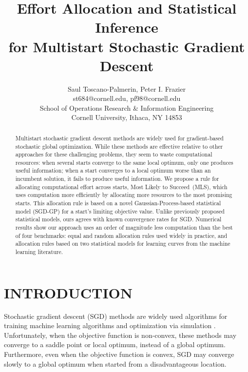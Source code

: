 \documentclass[12pt,english]{article}
\date{}
\newcommand{\abbrv}{MLS}
\newcommand{\name}{Most Likely to Succeed}
\begin{document}
\title{Effort Allocation and Statistical Inference\\ for Multistart Stochastic Gradient Descent}


\author{Saul Toscano-Palmerin, Peter I. Frazier\\
st684@cornell.edu, pf98@cornell.edu\\
School of Operations Research \& Information Engineering\\
Cornell University, Ithaca, NY 14853\\
}


\maketitle



\begin{abstract} 
Multistart stochastic gradient descent methods are widely used for gradient-based stochastic global optimization.  While these methods are effective relative to other approaches for these challenging problems, they seem to waste computational resources: when several starts converge to the same local optimum, only one produces useful information; when a start converges to a local optimum worse than an incumbent solution, it fails to produce useful information.  
We propose a rule for allocating computational effort across starts, \name\ (\abbrv), which uses computation more efficiently by allocating more resources to the most promising starts.  This allocation rule is based on a novel Gaussian-Process-based statistical model (SGD-GP) for a start's limiting objective value.  Unlike previously proposed statistical models, ours agrees with known convergence rates for SGD. 
Numerical results show our approach uses an order of magnitude less computation than the best of four benchmarks:
equal and random allocation rules used widely in practice,
and allocation rules based on two statistical models for learning curves from the machine learning literature.
\end{abstract}


\section{INTRODUCTION}
\label{sec:intro}

Stochastic gradient descent (SGD) methods \citep{robbins,sgd:Nemirovski,adam} are widely used algorithms for training machine learning algorithms \citep{cnn_cifar,murphy2012machine} and optimization via simulation \citep{fu2015}.
Unfortunately, when the objective function is non-convex, these methods may converge to a saddle point or local optimum, instead of a global optimum. Furthermore, even when the objective function is convex, SGD may converge slowly to a global optimum when started from a disadvantageous location. 
\end{document}
